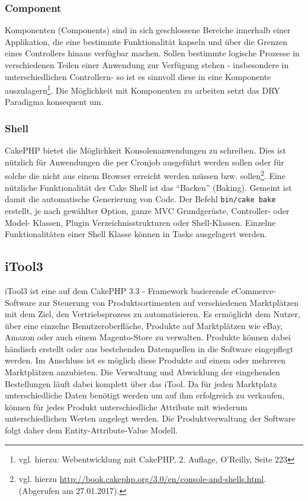 	\subsubsection{Component}
	Komponenten (Components) sind in sich geschlossene Bereiche innerhalb einer Applikation, die eine bestimmte Funktionalität kapseln und über die Grenzen eines Controllers hinaus verfügbar machen. Sollen bestimmte logische Prozesse in verschiedenen Teilen einer Anwendung zur Verfügung stehen - insbesondere in unterschiedlichen Controllern- so ist es sinnvoll diese in eine Komponente auszulagern\footnote{vgl. hierzu: Webentwicklung mit CakePHP, 2. Auflage, O'Reilly, Seite 223}.
	Die Möglichkeit mit Komponenten zu arbeiten setzt das DRY Paradigma konsequent um.
	
	\subsubsection{Shell}	%
	CakePHP bietet die Möglichkeit Konsolenanwendungen zu schreiben. Dies ist nützlich für Anwendungen die per Cronjob ausgeführt werden sollen oder für solche die nicht aus einem Browser erreicht werden müssen bzw. sollen\footnote{vgl. hierzu \url{http://book.cakephp.org/3.0/en/console-and-shells.html}.(Abgerufen am 27.01.2017).}. 
	Eine nützliche Funktionalität der Cake Shell ist das \enquote{Backen} (Baking). Gemeint ist damit die automatische Generierung von Code. Der Befehl \texttt{bin/cake bake} erstellt, je nach gewählter Option, ganze MVC Grundgerüste, Controller- oder Model- Klassen, Plugin Verzeichnisstrukturen oder Shell-Klassen. Einzelne Funktionalitäten einer Shell Klasse können in Tasks ausgelagert werden.  
	

	
	\subsection{iTool3}
	
	iTool3 ist eine auf dem CakePHP 3.3 - Framework basierende eCommerce-Software  zur Steuerung von Produktsortimenten auf verschiedenen Marktplätzen mit dem Ziel, den
	Vertriebsprozess zu automatisieren. Es ermöglicht dem Nutzer, über eine einzelne Benutzeroberfläche, Produkte auf Marktplätzen wie eBay, Amazon oder auch einem Magento-Store
	zu verwalten. Produkte können dabei händisch erstellt oder aus bestehenden Datenquellen in die Software	eingepflegt werden. Im Anschluss ist es möglich diese Produkte auf einem oder mehreren Marktplätzen anzubieten. Die Verwaltung und Abwicklung der eingehenden Bestellungen läuft dabei komplett über das iTool.
	Da für jeden Marktplatz unterschiedliche Daten benötigt werden um auf ihm erfolgreich zu verkaufen, können für jedes Produkt unterschiedliche Attribute mit wiederum unterschiedlichen Werten angelegt werden. Die Produktverwaltung der Software folgt daher dem Entity-Attribute-Value Modell.
	
